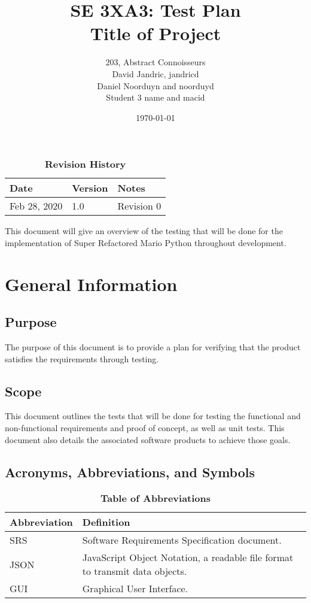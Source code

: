 \documentclass[12pt, titlepage]{article}
\title{SE 3XA3: Test Plan\\Title of Project}
\author{203, Abstract Connoisseurs
		\\ David Jandric, jandricd
		\\ Daniel Noorduyn and noorduyd
		\\ Student 3 name and macid
}
\date{\today}
\begin{document}
\maketitle

\tableofcontents
\listoftables
\listoffigures

\begin{table}[H]
\caption{\bf Revision History}
\begin{tabularx}{\textwidth}{p{3cm}p{2cm}X}
\toprule {\bf Date} & {\bf Version} & {\bf Notes}\\
\midrule
Feb 28, 2020 & 1.0 & Revision 0\\
\bottomrule
\end{tabularx}
\end{table}

\newpage


This document will give an overview of the testing that will be done for the implementation of Super
Refactored Mario Python throughout development.



\section{General Information}

\subsection{Purpose}
The purpose of this document is to provide a plan for verifying that the product
satisfies the requirements through testing.



\subsection{Scope}
This document outlines the tests that will be done for testing the functional and non-functional requirements and proof of concept, as well as unit tests. This document also details the associated software products to achieve those goals.



\subsection{Acronyms, Abbreviations, and Symbols}
\begin{table}[hbp]
\caption{\textbf{Table of Abbreviations}} \label{Table}
\begin{tabularx}{\textwidth}{p{3cm}X}
\toprule
\textbf{Abbreviation} & \textbf{Definition} \\
\midrule
SRS & Software Requirements Specification document.\\
JSON & JavaScript Object Notation, a readable file format to transmit data objects.\\
GUI & Graphical User Interface.\\

\bottomrule
\end{tabularx}
\end{table}
\end{document}
